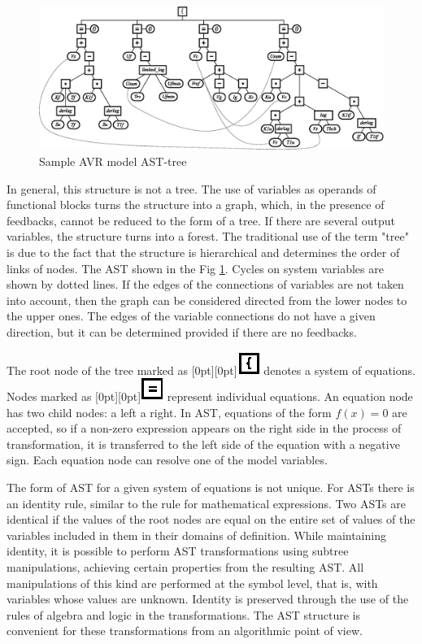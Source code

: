 \documentclass[lettersize,journal]{IEEEtran}
\begin{document}
\begin{figure}[h]
	\centering
	\includegraphics[width=\columnwidth]{ast.eps}
	\caption{Sample AVR model AST-tree }
	\label{fig_ast}
\end{figure}

In general, this structure is not a tree. The use of variables as operands of functional blocks turns the structure into a graph,
which, in the presence of feedbacks, cannot be reduced to the form of a tree. If there are several output variables, the structure
turns into a forest. The traditional use of the term "tree" is due to the fact that the structure is hierarchical and determines
the order of links of nodes. The AST shown in the Fig \ref{fig_ast}. Cycles on system variables are shown by dotted lines. 
If the edges of the connections of variables are not taken into account, then the graph can be considered directed from the lower
nodes to the upper ones. The edges of the variable connections do not have a given direction, but it can be determined 
provided if there are no feedbacks.

The root node of the tree marked as \raisebox{-2pt}[0pt][0pt]{\includegraphics{eq.eps}} denotes a system of equations. 
Nodes marked as \raisebox{-2pt}[0pt][0pt]{\includegraphics{let.eps}} represent individual equations. An equation node 
has two child nodes: a left a right. In AST, equations of the form \(f(x)=0\) are accepted, 
so if a non-zero expression appears on the right side in the process of transformation, it is transferred to the left 
side of the equation with a negative sign. Each equation node can resolve one of the model variables.

The form of AST for a given system of equations is not unique. For ASTs there is an identity rule, similar to the rule for
mathematical expressions. Two ASTs are identical if the values of the root nodes are equal on the entire set of values of the
variables included in them in their domains of definition. While maintaining identity, it is possible to perform AST 
transformations using subtree manipulations, achieving certain properties from the resulting AST. All manipulations of 
this kind are performed at the symbol level, that is, with variables whose values are unknown. Identity is preserved 
through the use of the rules of algebra and logic in the transformations. The AST structure is convenient for these 
transformations from an algorithmic point of view.
\end{document}
